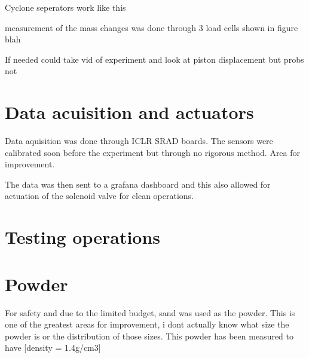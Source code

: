 Cyclone seperators work like this

measurement of the mass changes was done through 3 load cells shown in figure blah

If needed could take vid of experiment and look at piston displacement but probs not

\section{Data acuisition and actuators}
Data aquisition was done through ICLR SRAD boards. The sensors were calibrated soon before the experiment but through no rigorous method. Area for improvement.

The data was then sent to a grafana dashboard and this also allowed for actuation of the solenoid valve for clean operations.

\newpage
\section{Testing operations}

\section{Powder}
For safety and due to the limited budget, sand was used as the powder. This is one of the greatest areas for improvement, i dont actually know what size the powder is or the distribution of those sizes. This powder has been measured to have [density = 1.4g/cm3]